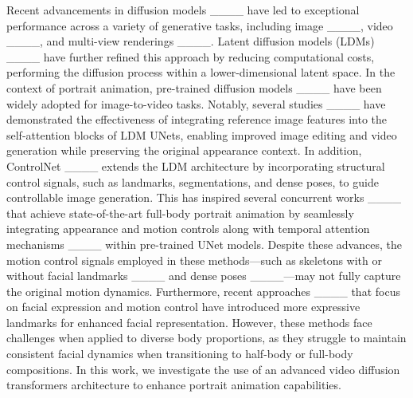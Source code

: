 Recent advancements in diffusion models ____ have led to exceptional performance across a variety of generative tasks, including image ____, video ____, and multi-view renderings ____. Latent diffusion models (LDMs) ____ have further refined this approach by reducing computational costs, performing the diffusion process within a lower-dimensional latent space. In the context of portrait animation, pre-trained diffusion models ____ have been widely adopted for image-to-video tasks. Notably, several studies ____ have demonstrated the effectiveness of integrating reference image features into the self-attention blocks of LDM UNets, enabling improved image editing and video generation while preserving the original appearance context. 
In addition,  ControlNet ____ extends the LDM architecture by incorporating structural control signals, such as landmarks, segmentations, and dense poses, to guide controllable image generation. This has inspired several concurrent works ____ that achieve state-of-the-art full-body portrait animation by seamlessly integrating appearance and motion controls along with temporal attention mechanisms ____ within pre-trained UNet models. Despite these advances, the motion control signals employed in these methods—such as skeletons with or without facial landmarks ____ and dense poses ____—may not fully capture the original motion dynamics. %
Furthermore, recent approaches ____ that focus on facial expression and motion control have introduced more expressive landmarks for enhanced facial representation. However, these methods face challenges when applied to diverse body proportions, as they struggle to maintain consistent facial dynamics when transitioning to half-body or full-body compositions. In this work, we investigate the use of an advanced video diffusion transformers architecture to enhance portrait animation capabilities.